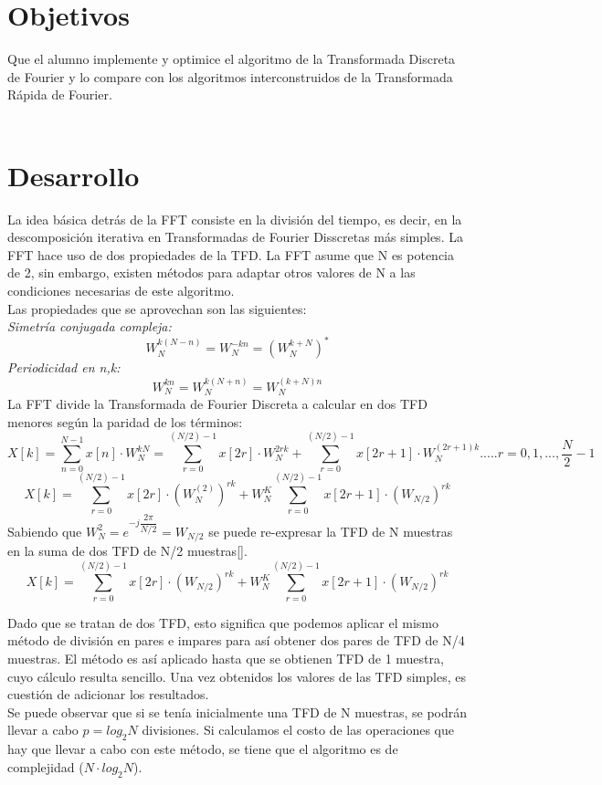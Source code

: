 \documentclass[12pt]{article}
\begin{document}
\section{Objetivos}
Que el alumno implemente y optimice el algoritmo de la Transformada Discreta de Fourier y lo compare con los algoritmos interconstruidos de la Transformada Rápida de Fourier. 
\\
\\

\section{Desarrollo}
La idea básica detrás de la FFT consiste en la división del tiempo, es decir, en la descomposición iterativa en Transformadas de Fourier Disscretas más simples. La FFT hace uso de dos propiedades de la TFD. La FFT asume que N es potencia de 2, sin embargo, existen métodos para adaptar otros valores de N a las condiciones necesarias de este algoritmo. 
\\
Las propiedades que se aprovechan son las siguientes:
\\
\textit{Simetría conjugada compleja:}
$$W_{N}^{k(N-n)} = W_{N}^{-kn} = (W_{N}^{k+N}) ^{*}$$
\textit{Periodicidad en n,k:}
$$W_{N}^{kn} = W_{N}^{k(N +n)} = W_{N}^{(k+N)n}$$
La FFT divide la Transformada de Fourier Discreta a calcular en dos TFD menores según la paridad de los términos:
$$X[k] = \sum_{n=0}^{N-1} x[n] \cdot W_{N}^{kN} = \sum_{r=0}^{(N/2)-1} x[2r] \cdot W_{N}^{2rk} + \sum_{r=0}^{(N/2)-1} x[2r+1] \cdot W_{N}^{(2r+1)k} ..... r=0,1,..., \dfrac{N}{2} -1$$
$$X[k] = \sum_{r=0}^{(N/2)-1} x[2r] \cdot (W_{N}^{(2)})^{rk} + W_{N}^{K} \sum_{r=0}^{(N/2)-1} x[2r+1] \cdot (W_{N/2})^{rk}$$
Sabiendo que $W_{N}^{2} = e^{-j\dfrac{2\pi}{N/2}} = W_{N/2}$ se puede re-expresar la TFD de N muestras en la suma de dos TFD de N/2 muestras[\cite{deergha2018digital}].
\begin{equation}
    X[k] = \sum_{r=0}^{(N/2)-1} x[2r] \cdot (W_{N/2})^{rk} + W_{N}^{K} \sum_{r=0}^{(N/2)-1} x[2r+1] \cdot (W_{N/2})^{rk}
\end{equation}

Dado que se tratan de dos TFD, esto significa que podemos aplicar el mismo método de división en pares e impares para así obtener dos pares de TFD de N/4 muestras. El método es así aplicado hasta que se obtienen TFD de 1 muestra, cuyo cálculo resulta sencillo. Una vez obtenidos los valores de las TFD simples, es cuestión de adicionar los resultados. 
\\
Se puede observar que si se tenía inicialmente una TFD de N muestras, se podrán llevar a cabo $p = log_{2} N$ divisiones. Si calculamos el costo de las operaciones que hay que llevar a cabo con este método, se tiene que el algoritmo es de complejidad ($N \cdot log_{2} N$).\\\\
\end{document}
